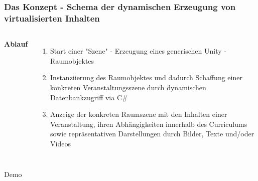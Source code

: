 \documentclass{beamer}
\begin{document}
\begin{frame}
\frametitle{Das Konzept - Schema der dynamischen Erzeugung von virtualisierten Inhalten}
\begin{adjustbox}{totalheight=\baselineskip}
\begin{columns}[c] %


\textbf{Ablauf}
\begin{enumerate}
\item Start einer "Szene" -  Erzeugung eines generischen Unity - Raumobjektes
\item Instanziierung des Raumobjektes und dadurch Schaffung einer konkreten Veranstaltungsszene durch dynamischen Datenbankzugriff via C\#
\item  Anzeige der konkreten Raumszene mit den Inhalten einer Veranstaltung, ihren Abhängigkeiten innerhalb des Curriculums sowie repräsentativen Darstellungen durch Bilder, Texte und/oder Videos
\end{enumerate}



\end{columns}
\end{adjustbox}
\end{frame}


\begin{frame}
\Huge{\centerline{Demo}}
\end{frame}

\end{document}
